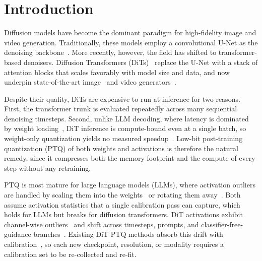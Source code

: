 \vspace{-2mm}
\section{Introduction}
\label{sec:intro}
\vspace{-2mm}
Diffusion models have become the dominant paradigm for high-fidelity image and video generation. Traditionally, these models employ a convolutional U-Net as the denoising backbone~\cite{rombach2022high, saharia2022photorealistic, singer2022make, ho2020denoising}. More recently, however, the field has shifted to transformer-based denoisers. Diffusion Transformers (DiTs)~\cite{peebles2023scalable, bao2023all} replace the U-Net with a stack of attention blocks that scales favorably with model size and data, and now underpin state-of-the-art image~\cite{chen2024pixart, esser2024scaling, labs2025flux1kontextflowmatching, xie2024sana, wu2025qwen, cai2025z} and video generators~\cite{sora2024, yang2025cogvideox, kong2024hunyuanvideo, wan2025wan}.

Despite their quality, DiTs are expensive to run at inference for two reasons. First, the transformer trunk is evaluated repeatedly across many sequential denoising timesteps. Second, unlike LLM decoding, where latency is dominated by weight loading~\cite{lin2024awq, frantar2022gptq}, DiT inference is compute-bound even at a single batch, so weight-only quantization yields no measured speedup~\cite{li2024svdquant}. Low-bit post-training quantization (PTQ) of both weights and activations is therefore the natural remedy, since it compresses both the memory footprint and the compute of every step without any retraining.

PTQ is most mature for large language models (LLMs), where activation outliers are handled by scaling them into the weights~\cite{xiao2023smoothquant} or rotating them away~\cite{ashkboos2024quarot, liu2025spinquant, chee2023quip, tseng2024quip}. Both assume activation statistics that a single calibration pass can capture, which holds for LLMs but breaks for diffusion transformers. DiT activations exhibit channel-wise outliers~\cite{wu2024ptq4dit} and shift across timesteps, prompts, and classifier-free-guidance branches~\cite{chen2025q, zhao2024vidit}. Existing DiT PTQ methods absorb this drift with calibration~\cite{zhao2024vidit, li2024svdquant, zhang2026adatsq}, so each new checkpoint, resolution, or modality requires a calibration set to be re-collected and re-fit.

